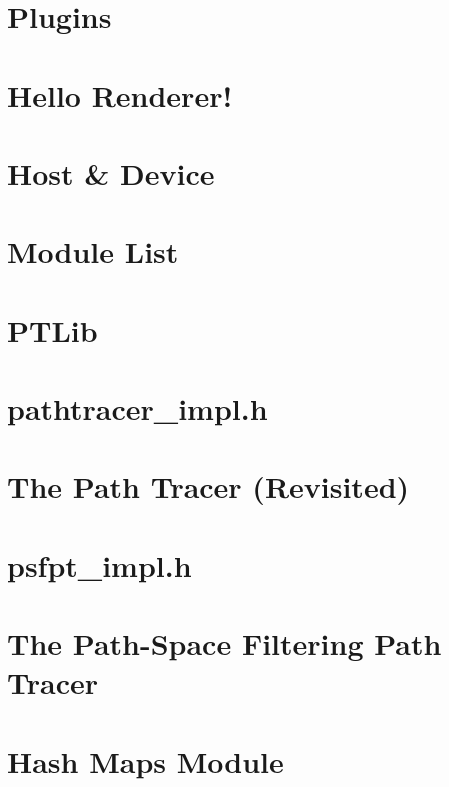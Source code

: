 \documentclass[twoside]{book}
\newcommand{\+}{\discretionary{\mbox{\scriptsize$\hookleftarrow$}}{}{}}
\begin{document}
\chapter{Plugins}
\label{_plugins_page}

\chapter{Hello Renderer!}
\label{_hello_renderer_page}

\chapter{Host \& Device}
\label{_fermat_host_device_page}

\chapter{Module List}
\label{_modules_page}

\chapter{P\+T\+Lib}
\label{_p_t_lib_page}

\chapter{pathtracer\+\_\+impl.\+h}
\label{_p_t_page_code}

\chapter{The Path Tracer (Revisited)}
\label{_p_t_page}

\chapter{psfpt\+\_\+impl.\+h}
\label{_p_s_f_p_t_page_code}

\chapter{The Path-\/\+Space Filtering Path Tracer}
\label{_p_s_f_p_t_page}

\chapter{Hash Maps Module}
\label{hashmaps_page}

\end{document}

